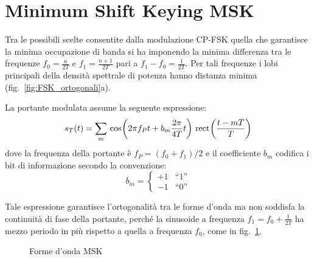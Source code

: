 \section{Minimum Shift Keying \ac{MSK}}
Tra le possibili scelte consentite dalla modulazione \ac{CP-FSK} quella che garantisce la minima occupazione di banda si ha imponendo la minima differenza tra le frequenze $f_0=\frac{n}{2T}$ e $f_1=\frac{n+1}{2T}$ pari a $f_1-f_0=\frac{1}{2T}$.
Per tali frequenze i lobi principali della densità spettrale di potenza hanno distanza minima (fig.~\ref{fig:FSK_ortogonali}a).

La portante modulata assume la seguente espressione:
\begin{equation}
s_T(t)=\sum_{m}{\,{\operatorname{cos}}^{}\!\left({2\pi f_P t + b_m\frac{2\pi}{4T}t}\right)\,{\operatorname{rect}}^{}\!\left({\frac{t-m T}{T}}\right)}
\label{eq:FSK_portante_modulata}
\end{equation}
dove la frequenza della portante è $f_P=(f_0+f_1)/2$ e il coefficiente $b_m$ codifica i bit di informazione secondo la convenzione:
\[ b_m=\begin{cases}
+1 & \text{“1”}\\-1 & \text{“0”}
\end{cases} \]

Tale espressione garantisce l'ortogonalità tra le forme d'onda ma non soddisfa la continuità di fase della portante, perché la sinusoide a frequenza $f_1=f_0+\frac{1}{2T}$ ha mezzo periodo in più rispetto a quella a frequenza $f_0$, come in fig.~\ref{fig:FSK_forme_d'onda}.

\begin{figure}[ht]\centering
\def\freqP{1}
\caption{Forme d'onda \ac{MSK}}
\label{fig:FSK_forme_d'onda}
\end{figure}

